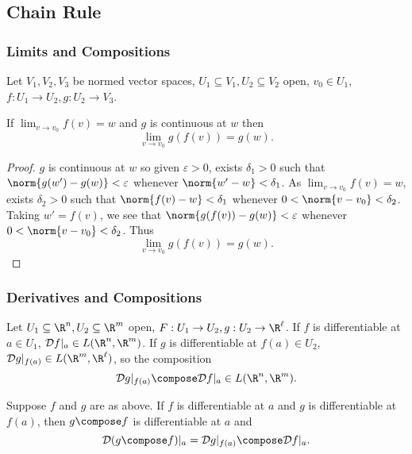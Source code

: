 \documentclass[a4paper]{article}
\newcommand*{\D}{\mathcal{D}}
\theoremstyle{definition}
\begin{document}
\subsection{Chain Rule}

\subsubsection{Limits and Compositions}

Let \(V_1, V_2, V_3\) be normed vector spaces, \(U_1 \subseteq V_1, U_2 \subseteq V_2\) open, \(v_0 \in U_1\), \(f: U_1 \to U_2, g: U_2 \to V_3\).

\begin{lemma}
  If \(\lim_{v \to v_0} f(v) = w\) and \(g\) is continuous at \(w\) then
  \[
    \lim_{v \to v_0} g(f(v)) = g(w).
  \]
\end{lemma}

\begin{proof}
  \(g\) is continuous at \(w\) so given \(\varepsilon > 0\), exists \(\delta_1 > 0\) such that \(\norm{g(w') - g(w)} < \varepsilon\) whenever \(\norm{w' - w} < \delta_1\). As \(\lim_{v \to v_0} f(v) = w\), exists \(\delta_2 > 0\) such that \(\norm{f(v) - w} < \delta_1\) whenever \(0 < \norm{v - v_0} < \delta_2\). Taking \(w' = f(v)\), we see that \(\norm{g(f(v)) - g(w)} < \varepsilon\) whenever \(0 < \norm{v - v_0} < \delta_2\). Thus
  \[
    \lim_{v \to v_0} g(f(v)) = g(w).
  \]
\end{proof}

\subsubsection{Derivatives and Compositions}

Let \(U_1 \subseteq \R^n, U_2 \subseteq \R^m\) open, \(F: U_1 \to U_2, g: U_2 \to \R^\ell\). If \(f\) is differentiable at \(a \in U_1\), \(\D f|_a \in L(\R^n, \R^m)\). If \(g\) is differentiable at \(f(a) \in U_2\), \(\D g|_{f(a)} \in L(\R^m, \R^\ell)\), so the composition
\[
  \D g|_{f(a)} \compose \D f|_a \in L(\R^n, \R^m).
\]

\begin{theorem}
  Suppose \(f\) and \(g\) are as above. If \(f\) is differentiable at \(a\) and \(g\) is differentiable at \(f(a)\), then \(g \compose f\) is differentiable at \(a\) and
  \[
    \D (g \compose f)|_a = \D g|_{f(a)} \compose \D f|_a.
  \]
\end{theorem}
\end{document}
